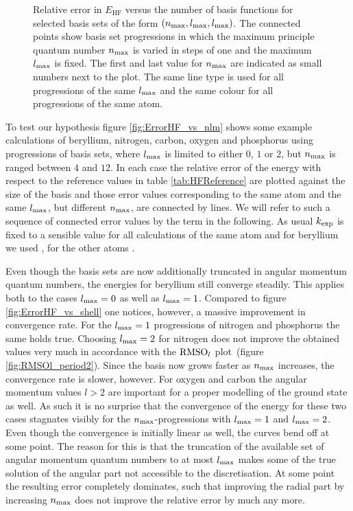 \begin{figure}
	\centering
	\caption[
		Relative error in $E_\text{HF}$ versus the basis size
		for selected \CS discretisations
	]{
		Relative error in $E_\text{HF}$ versus the number of basis functions
		for selected \CS basis sets of the form $(n_\text{max}, l_\text{max}, l_\text{max})$.
		The connected points show basis set progressions
		in which the maximum principle quantum number 
		$n_\text{max}$ is varied in steps of one and the maximum $l_\text{max}$ is fixed.
		The first and last value for $n_\text{max}$ are indicated as small numbers
		next to the plot.
		The same line type is used for all progressions of the same $l_\text{max}$
		and the same colour for all progressions of the same atom.
	}
	\label{fig:ErrorHF_vs_nlm}
\end{figure}
To test our hypothesis figure \vref{fig:ErrorHF_vs_nlm} shows some
example calculations
of beryllium, nitrogen, carbon, oxygen and phosphorus
using progressions of \CS basis sets, where $l_\text{max}$ is limited
to either $0$, $1$ or $2$,
but $n_\text{max}$ is ranged between $4$ and $12$.
In each case the relative error of the \HF energy
with respect to the reference values in table \ref{tab:HFReference}
are plotted against the size of the \CS basis
and those error values corresponding to the same atom and the same $l_\text{max}$,
but different $n_\text{max}$, are connected by lines.
We will refer to such a sequence of connected error values
by the term  in the following.
As usual $k_\text{exp}$ is fixed to a sensible value for all calculations
of the same atom
and for beryllium we used \RHF, for the other atoms \UHF.

Even though the basis sets
are now additionally truncated in angular momentum quantum numbers,
the \HF energies for beryllium still converge steadily.
This applies both to the cases $l_\text{max} = 0$ as well as $l_\text{max} = 1$.
Compared to figure \ref{fig:ErrorHF_vs_shell} one notices,
however, a massive improvement in convergence rate.
For the $l_\text{max} = 1$ progressions of nitrogen and phosphorus the same holds true.
Choosing $l_\text{max} = 2$ for nitrogen does not improve the obtained
values very much
in accordance with the $\text{RMSO}_l$ plot~(figure \ref{fig:RMSOl_period2}).
Since the basis now grows faster as $n_\text{max}$ increases,
the convergence rate is slower, however.
For oxygen and carbon the angular momentum values $l > 2$ are important
for a proper modelling of the ground state as well.
As such it is no surprise that the convergence of the \HF energy
for these two cases stagnates visibly for the $n_\text{max}$-progressions
with $l_\text{max} = 1$ and $l_\text{max} = 2$.
Even though the convergence is initially linear as well,
the curves bend off at some point.
The reason for this is that the truncation of the available
set of angular momentum quantum numbers to at most $l_\text{max}$
makes some of the true solution of the angular part not accessible
to the \CS discretisation.
At some point the resulting error completely dominates,
such that improving the radial part by increasing $n_\text{max}$
does not improve the relative error by much any more.

